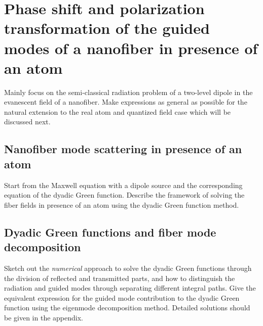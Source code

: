 \documentclass[preprint,pra,onecolumn]{revtex4-1} %
\begin{document}
\section{Phase shift and polarization transformation of the guided modes of a nanofiber in presence of an atom}
Mainly focus on the semi-classical radiation problem of a two-level dipole in the evanescent field of a nanofiber. Make expressions as general as possible for the natural extension to the real atom and quantized field case which will be discussed next. 

\subsection{Nanofiber mode scattering in presence of an atom}
Start from the Maxwell equation with a dipole source and the corresponding equation of the dyadic Green function. Describe the framework of solving the fiber fields in presence of an atom using the dyadic Green function method.

\subsection{Dyadic Green functions and fiber mode decomposition}
Sketch out the \textit{numerical} approach to solve the dyadic Green functions through the division of reflected and transmitted parts, and how to distinguish the radiation and guided modes through separating different integral paths. Give the equivalent expression for the guided mode contribution to the dyadic Green function using the eigenmode decomposition method. Detailed solutions should be given in the appendix. 
\end{document}
